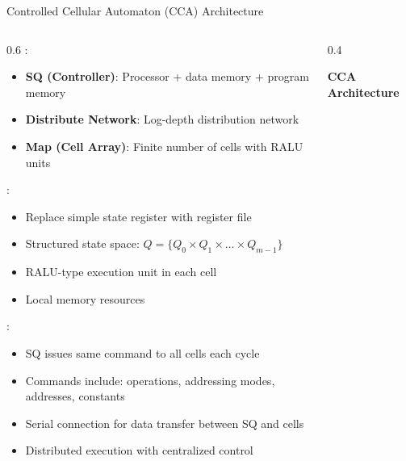 \begin{frame}{Controlled Cellular Automaton (CCA) Architecture}
\begin{columns}
\begin{column}{0.6\textwidth}
:
\begin{itemize}
\item \textbf{SQ (Controller)}: Processor + data memory + program memory
\item \textbf{Distribute Network}: Log-depth distribution network
\item \textbf{Map (Cell Array)}: Finite number of cells with RALU units
\end{itemize}

\vspace{0.3cm}
:
\begin{itemize}
\item Replace simple state register with register file
\item Structured state space: $Q = \{Q_0 \times Q_1 \times \ldots \times Q_{m-1}\}$
\item RALU-type execution unit in each cell
\item Local memory resources
\end{itemize}

\vspace{0.3cm}
:
\begin{itemize}
\item SQ issues same command to all cells each cycle
\item Commands include: operations, addressing modes, addresses, constants
\item Serial connection for data transfer between SQ and cells
\item Distributed execution with centralized control
\end{itemize}
\end{column}
\begin{column}{0.4\textwidth}
\begin{center}
\textbf{CCA Architecture}
\vspace{0.3cm}

\end{center}
\end{column}
\end{columns}
\end{frame}
